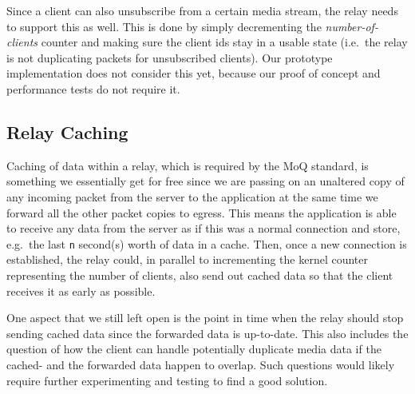 Since a client can also unsubscribe from a certain media stream, the relay needs to support
this as well.
This is done by simply decrementing the \textit{number-of-clients} counter and making sure the 
client ids stay in a usable state (i.e.~the relay is not duplicating packets for unsubscribed 
clients).
Our prototype implementation does not consider this yet, because our proof of concept and 
performance tests do not require it.

\subsection{Relay Caching}
Caching of data within a relay, which is required by the MoQ standard, is something we essentially get
for free since we are passing on an unaltered copy of any incoming packet from the server to the 
application at the same time we forward all the other packet copies to egress.
This means the application is able to receive any data from the server as if this was a normal connection and 
store, e.g.~the last \verb|n| second(s) worth of data in a cache.
Then, once a new connection is established, the relay could, in parallel to incrementing the kernel counter 
representing the number of clients, also send out cached data so that the client receives it
as early as possible.

One aspect that we still left open is the point in time when the relay should stop 
sending cached data since the forwarded data is up-to-date.
This also includes the question of how the client can handle potentially duplicate media data if the 
cached- and the forwarded data happen to overlap.
Such questions would likely require further experimenting and testing to find a good solution.
